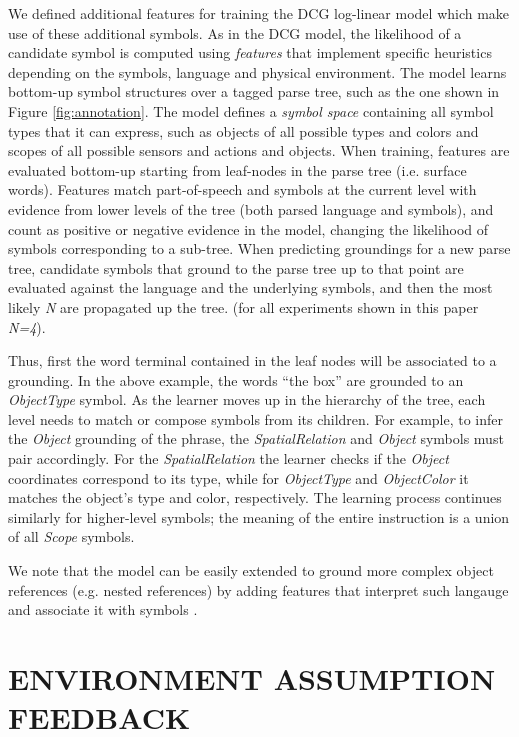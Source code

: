\documentclass[letterpaper]{article} %
\begin{document}
We defined additional features for training the DCG log-linear model which make use of these additional symbols. As in the DCG model, the likelihood of a candidate symbol is computed using \textit{features} that implement specific heuristics depending on the symbols, language and physical environment. The model learns bottom-up symbol structures over a tagged parse tree, such as the one shown in Figure \ref{fig:annotation}. The model defines a \textit{symbol space} containing all symbol types that it can express, such as objects of all possible types and colors and scopes of all possible sensors and actions and objects. 
When training, features are evaluated bottom-up starting from leaf-nodes in the parse tree (i.e. surface words). Features match part-of-speech and symbols at the current level with evidence from lower levels of the tree (both parsed language and symbols), and count as positive or negative evidence in the model, changing the likelihood of symbols corresponding to a sub-tree.
When predicting groundings for a new parse tree, candidate symbols that ground to the parse tree up to that point are evaluated against the language and the underlying symbols, and then the most likely \textit{N} are propagated up the tree. (for all experiments shown in this paper \textit{N=4}).

Thus, first the word terminal contained in the leaf nodes will be associated to a grounding. In the above example, the words ``the box'' are grounded to an \textit{ObjectType} symbol. As the learner moves up in the hierarchy of the tree, each level needs to match or compose symbols from its children. For example, to infer the \textit{Object} grounding of the phrase, the \textit{SpatialRelation} and \textit{Object} symbols must pair accordingly. For the \textit{SpatialRelation} the learner checks if the \textit{Object} coordinates correspond to its type, while for \textit{ObjectType} and \textit{ObjectColor} it matches the object's type and color, respectively. The learning process continues similarly for higher-level symbols; the meaning of the entire instruction is a union of all \textit{Scope} symbols.

We note that the model can be easily extended to ground more complex object references (e.g. nested references) by adding features that interpret such langauge and associate it with symbols \cite{chung2015performance}. 

\section{ENVIRONMENT ASSUMPTION FEEDBACK}\label{sec:assumptions}
\end{document}
